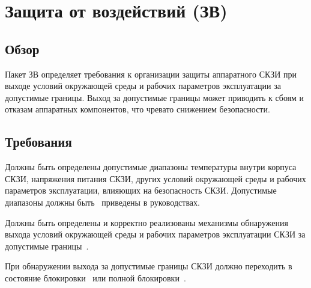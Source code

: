 \section{Защита от воздействий (ЗВ)}\label{EF}

\subsection{Обзор}\label{EF.Intro}

Пакет ЗВ определяет требования к организации защиты аппаратного СКЗИ при выходе 
условий окружающей среды и рабочих параметров эксплуатации за допустимые границы.  
%
Выход за допустимые границы может приводить к сбоям и отказам аппаратных 
компонентов, что чревато снижением безопасности.   

\subsection{Требования}\label{EF.Reqs}

\label{R.EF.Ranges}
Должны быть определены допустимые диапазоны температуры внутри корпуса СКЗИ, 
напряжения питания СКЗИ, других условий окружающей среды и рабочих параметров 
эксплуатации, влияющих на безопасность СКЗИ. Допустимые диапазоны должны 
быть~ приведены в руководствах.

\label{R.EF.Detect}
Должны быть определены и корректно реализованы механизмы 
обнаружения выхода условий окружающей среды и рабочих параметров 
эксплуатации СКЗИ за допустимые границы~. 

\label{R.EF.Lock}
При обнаружении выхода за допустимые границы СКЗИ должно переходить
в состояние блокировки~ или полной 
блокировки~. 
